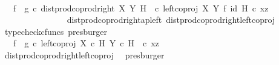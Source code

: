\begin{isabellebody}
\ \ \ \ \ \ \ \ \ \ \ \ \isamarkupfalse%
\ \isamarkupfalse%
\ {\isachardoublequoteopen}{\isachardot}{\kern0pt}{\isachardot}{\kern0pt}{\isachardot}{\kern0pt}\ {\isacharequal}{\kern0pt}\ {\isacharparenleft}{\kern0pt}f\isactrlsup {\isasymflat}\ {\isasymamalg}\ g\isactrlsup {\isasymflat}{\isacharparenright}{\kern0pt}\ {\isasymcirc}\isactrlsub c\ {\isacharparenleft}{\kern0pt}{\isacharparenleft}{\kern0pt}dist{\isacharunderscore}{\kern0pt}prod{\isacharunderscore}{\kern0pt}coprod{\isacharunderscore}{\kern0pt}right\ X\ Y\ H\ \ {\isasymcirc}\isactrlsub c\ {\isacharparenleft}{\kern0pt}left{\isacharunderscore}{\kern0pt}coproj\ X\ Y\ {\isasymtimes}\isactrlsub f\ id\ H{\isacharparenright}{\kern0pt}{\isacharparenright}{\kern0pt}\ {\isasymcirc}\isactrlsub c\ {\isasymlangle}x{\isacharcomma}{\kern0pt}z{\isasymrangle}{\isacharparenright}{\kern0pt}{\isachardoublequoteclose}\isanewline
\ \ \ \ \ \ \ \ \ \ \ \ \ \ \isamarkupfalse%
\ dist{\isacharunderscore}{\kern0pt}prod{\isacharunderscore}{\kern0pt}coprod{\isacharunderscore}{\kern0pt}right{\isacharunderscore}{\kern0pt}ap{\isacharunderscore}{\kern0pt}left\ dist{\isacharunderscore}{\kern0pt}prod{\isacharunderscore}{\kern0pt}coprod{\isacharunderscore}{\kern0pt}right{\isacharunderscore}{\kern0pt}left{\isacharunderscore}{\kern0pt}coproj\ \isamarkupfalse%
\ {\isacharparenleft}{\kern0pt}typecheck{\isacharunderscore}{\kern0pt}cfuncs{\isacharcomma}{\kern0pt}\ presburger{\isacharparenright}{\kern0pt}\isanewline
\ \ \ \ \ \ \ \ \ \ \ \ \isamarkupfalse%
\ \isamarkupfalse%
\ {\isachardoublequoteopen}{\isachardot}{\kern0pt}{\isachardot}{\kern0pt}{\isachardot}{\kern0pt}\ {\isacharequal}{\kern0pt}\ {\isacharparenleft}{\kern0pt}f\isactrlsup {\isasymflat}\ {\isasymamalg}\ g\isactrlsup {\isasymflat}{\isacharparenright}{\kern0pt}\ {\isasymcirc}\isactrlsub c\ {\isacharparenleft}{\kern0pt}left{\isacharunderscore}{\kern0pt}coproj\ {\isacharparenleft}{\kern0pt}X\ {\isasymtimes}\isactrlsub c\ H{\isacharparenright}{\kern0pt}\ {\isacharparenleft}{\kern0pt}Y\ {\isasymtimes}\isactrlsub c\ H{\isacharparenright}{\kern0pt}\ \ {\isasymcirc}\isactrlsub c\ {\isasymlangle}x{\isacharcomma}{\kern0pt}z{\isasymrangle}{\isacharparenright}{\kern0pt}{\isachardoublequoteclose}\isanewline
\ \ \ \ \ \ \ \ \ \ \ \ \ \ \isamarkupfalse%
\ dist{\isacharunderscore}{\kern0pt}prod{\isacharunderscore}{\kern0pt}coprod{\isacharunderscore}{\kern0pt}right{\isacharunderscore}{\kern0pt}left{\isacharunderscore}{\kern0pt}coproj\ \isamarkupfalse%
\ presburger\isanewline

\end{isabellebody}
